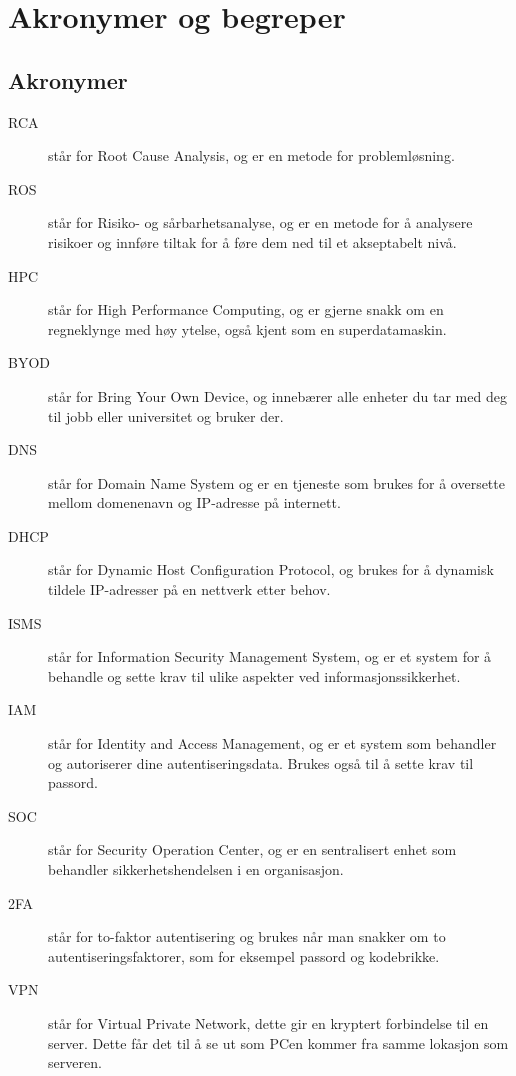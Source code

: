 \chapter*{Akronymer og begreper}
\label{kap:akronymer}

\section*{Akronymer}
\begin{description}
    \item[RCA] står for Root Cause Analysis, og er en metode for problemløsning.
    \item[ROS] står for Risiko- og sårbarhetsanalyse, og er en metode for å analysere risikoer og innføre tiltak for å føre dem ned til et akseptabelt nivå.
    \item[HPC] står for High Performance Computing, og er gjerne snakk om en regneklynge med høy ytelse, også kjent som en superdatamaskin.
    \item[BYOD] står for Bring Your Own Device, og innebærer alle enheter du tar med deg til jobb eller universitet og bruker der.
    \item[DNS] står for Domain Name System og er en tjeneste som brukes for å oversette mellom domenenavn og IP-adresse på internett.
    \item[DHCP] står for Dynamic Host Configuration Protocol, og brukes for å dynamisk tildele IP-adresser på en nettverk etter behov.
    \item[ISMS] står for Information Security Management System, og er et system for å behandle og sette krav til ulike aspekter ved informasjonssikkerhet.
    \item[IAM] står for Identity and Access Management, og er et system som behandler og autoriserer dine autentiseringsdata. Brukes også til å sette krav til passord. 
    \item[SOC] står for Security Operation Center, og er en sentralisert enhet som behandler sikkerhetshendelsen i en organisasjon. 
    \item[2FA] står for to-faktor autentisering og brukes når man snakker om to autentiseringsfaktorer, som for eksempel passord og kodebrikke. 
    \item[VPN] står for Virtual Private Network, dette gir en kryptert forbindelse til en server. Dette får det til å se ut som PCen kommer fra samme lokasjon som serveren.
\end{description}


